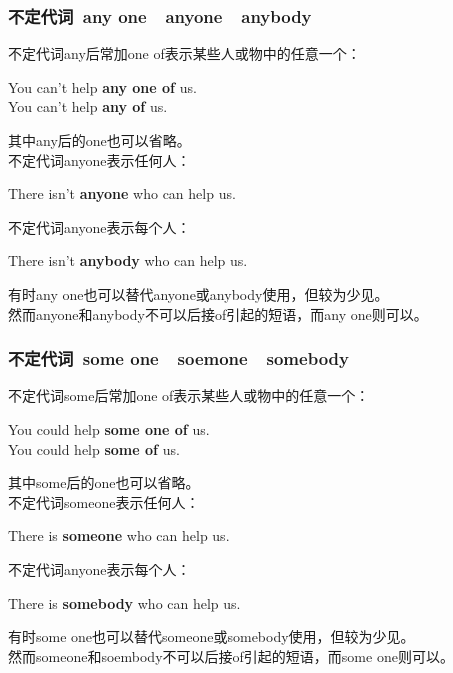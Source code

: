 \documentclass[UTF8]{ctexart}
\newcommand{\littf}[1]{{\hspace{3pt}\ttfamily #1}}
\begin{document}
\newpage

\subsubsection{不定代词~\littf{any one}~~\littf{anyone}~~\littf{anybody}}
    不定代词\littf{any}后常加\littf{one of}表示某些人或物中的任意一个：
    \begin{center}
        \large\ttfamily
        You can't help \textbf{any one of} us.\\[3mm]
        You can't help \textbf{any of} us.\\[6mm]
    \end{center}
    其中\littf{any}后的\littf{one}也可以省略。\\[10mm]
    不定代词\littf{anyone}表示任何人：
    \begin{center}
        \large\ttfamily
        There isn't \textbf{anyone} who can help us.\\[6mm]
    \end{center}
    不定代词\littf{anyone}表示每个人：
    \begin{center}
        \large\ttfamily
        There isn't \textbf{anybody} who can help us.\\[6mm]
    \end{center}
    有时\littf{any one}也可以替代\littf{anyone}或\littf{anybody}使用，但较为少见。\\[3mm]
    然而\littf{anyone}和\littf{anybody}不可以后接\littf{of}引起的短语，而\littf{any one}则可以。

\newpage

\subsubsection{不定代词~\littf{some one}~~\littf{soemone}~~\littf{somebody}}
    不定代词\littf{some}后常加\littf{one of}表示某些人或物中的任意一个：
    \begin{center}
        \large\ttfamily
        You could help \textbf{some one of} us.\\[3mm]
        You could help \textbf{some of} us.\\[6mm]
    \end{center}
    其中\littf{some}后的\littf{one}也可以省略。\\[10mm]
    不定代词\littf{someone}表示任何人：
    \begin{center}
        \large\ttfamily
        There is \textbf{someone} who can help us.\\[6mm]
    \end{center}
    不定代词\littf{anyone}表示每个人：
    \begin{center}
        \large\ttfamily
        There is \textbf{somebody} who can help us.\\[6mm]
    \end{center}
    有时\littf{some one}也可以替代\littf{someone}或\littf{somebody}使用，但较为少见。\\[3mm]
    然而\littf{someone}和\littf{soembody}不可以后接\littf{of}引起的短语，而\littf{some one}则可以。
\end{document}
